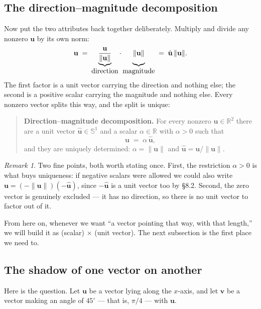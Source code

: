 \documentclass[11pt]{article}
\theoremstyle{definition}
\theoremstyle{remark}
\newtheorem*{rmk}{Remark}
\newcommand{\R}{\mathbb{R}}
\newcommand{\vc}[1]{\mathbf{#1}}
\newcommand{\norm}[1]{\lVert #1\rVert}
\newcommand{\uv}[1]{\hat{\vc{#1}}}                 %
\newcommand{\Sph}[1]{\mathbb{S}^{#1}}              %
\begin{document}
\subsection{The direction--magnitude decomposition}
Now put the two attributes back together deliberately. Multiply and divide any
nonzero $\vc{u}$ by its own norm:
\[
  \vc{u}
  \;=\;
  \underbrace{\frac{\vc{u}}{\norm{\vc{u}}}}_{\textstyle\text{direction}}
  \cdot
  \underbrace{\vphantom{\frac{\vc{u}}{\norm{\vc{u}}}}\norm{\vc{u}}}_{\textstyle\text{magnitude}}
  \;=\;
  \uv{u}\,\norm{\vc{u}} .
\]
The first factor is a unit vector carrying the direction and nothing else; the
second is a positive scalar carrying the magnitude and nothing else. Every
nonzero vector splits this way, and the split is unique:

\begin{quote}
\textbf{Direction--magnitude decomposition.} For every nonzero
$\vc{u}\in\R^{2}$ there are a unit vector $\uv{u}\in\Sph{1}$ and a scalar
$\alpha\in\R$ with $\alpha>0$ such that
\[
  \vc{u} \;=\; \alpha\,\uv{u} ,
\]
and they are uniquely determined: $\alpha=\norm{\vc{u}}$ and
$\uv{u}=\vc{u}/\norm{\vc{u}}$.
\end{quote}

\begin{rmk}
Two fine points, both worth stating once. First, the restriction $\alpha>0$ is
what buys uniqueness: if negative scalars were allowed we could also write
$\vc{u}=(-\norm{\vc{u}})(-\uv{u})$, since $-\uv{u}$ is a unit vector too by
\S8.2. Second, the zero vector is genuinely excluded --- it has no direction, so
there is no unit vector to factor out of it.
\end{rmk}

\noindent From here on, whenever we want ``a vector pointing that way, with that
length,'' we will build it as (scalar)$\,\times\,$(unit vector). The next
subsection is the first place we need to.

\subsection{The shadow of one vector on another}
Here is the question. Let $\vc{u}$ be a vector lying along the $x$-axis, and let
$\vc{v}$ be a vector making an angle of $45^{\circ}$ --- that is, $\pi/4$ ---
with $\vc{u}$.
\end{document}
